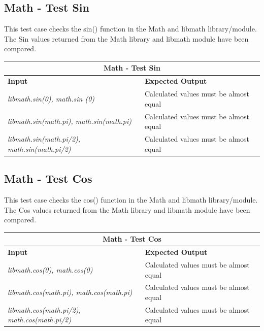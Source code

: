 \subsection{Math - Test Sin}
\begin{flushleft}
    This test case checks the sin() function in the Math and libmath library/module. 
    The Sin values returned from the Math library and libmath module have been compared.
\vspace*{1em}

\begin{tabular}{ |p{6cm}||p{6cm} |  }
    \hline
    \multicolumn{2}{|c|}{\textbf{Math - Test Sin}} \\
    \hline
    \textbf{Input} & \textbf{Expected Output}\\
    \hline
    \textit{libmath.sin(0), math.sin (0)}   & Calculated values must be almost equal \\
    \hline
    \textit{libmath.sin(math.pi), math.sin(math.pi)} & Calculated values must be almost equal \\
    \hline
    \textit{libmath.sin(math.pi/2), math.sin(math.pi/2)}  & Calculated values must be almost equal \\
    \hline
\end{tabular}
\end{flushleft}

\vspace*{1em}
\subsection{Math - Test Cos}
\begin{flushleft}
    This test case checks the cos() function in the Math and libmath library/module.
    The Cos values returned from the Math library and libmath module have been compared. 
\vspace*{1em}

\begin{tabular}{ |p{6cm}||p{6cm} |  }
    \hline
    \multicolumn{2}{|c|}{\textbf{Math - Test Cos}} \\
    \hline
    \textbf{Input} & \textbf{Expected Output}\\
    \hline
    \textit{libmath.cos(0), math.cos(0)}   & Calculated values must be almost equal \\
    \hline
    \textit{libmath.cos(math.pi), math.cos(math.pi)} & Calculated values must be almost equal \\
    \hline
    \textit{libmath.cos(math.pi/2), math.cos(math.pi/2)}  & Calculated values must be almost equal \\
    \hline
\end{tabular}
\end{flushleft}

